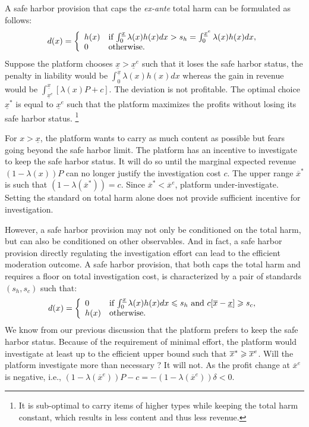 A safe harbor provision that caps the \emph{ex-ante} total harm can be formulated as follows:
\begin{equation}
d(x)=
\left\{\begin{array}{ll}
    h(x) & \mbox{if $\int_0^{\underline{x}}\lambda(x)h(x)dx>s_h=\int_0^{\underline{x}^e}\lambda(x)h(x)dx$}, \\
    0 & \mbox{otherwise}.
\end{array}\right.
\end{equation}
Suppose the platform chooses $\underline{x}>\underline{x}^e$ such that it loses the safe harbor status, the penalty in liability would be $\int_0^{\underline{x}}\lambda(x)h(x)dx$ whereas the gain in revenue would be $\int_{\underline{x}^e}^{\underline{x}}[\lambda(x)P+c]$. The deviation is not profitable.
The optimal choice $\underline{x}^*$ is equal to $\underline{x}^e$ such that the platform maximizes the profits without losing its safe harbor status. 
\footnote{It is sub-optimal to carry items of higher types while keeping the total harm constant, which results in less content and thus less revenue.}

For $x>\underline{x}$, the platform wants to carry as much content as possible but fears going beyond the safe harbor limit. The platform has an incentive to investigate to keep the safe harbor status. It will do so until the marginal expected revenue $(1-\lambda(x))P$ can no longer justify the investigation cost $c$. The upper range $\overline{x}^*$ is such that $(1-\lambda(\overline{x}^*))=c$. 
Since $\overline{x}^*<\overline{x}^e$, platform under-investigate.
Setting the standard on total harm alone does not provide sufficient incentive for investigation.

However, a safe harbor provision may not only be conditioned on the total harm, but can also be conditioned on other observables. And in fact, a safe harbor provision directly regulating the investigation effort can lead to the efficient moderation outcome. A safe harbor provision, that both caps the total harm and requires a floor on total investigation cost, is characterized by a pair of standards $(s_h,s_c)$ such that:
\begin{equation}
d(x)=
\left\{\begin{array}{ll}
    0 & \mbox{if $\int_0^{\underline{x}}\lambda(x)h(x)dx\leqslant s_h$ and $c[\overline{x}-\underline{x}]\geqslant s_c$}, \\
    h(x) & \mbox{otherwise}.
\end{array}\right.
\end{equation}
We know from our previous discussion that the platform prefers to keep the safe harbor status. Because of the requirement of minimal effort, the platform would investigate at least up to the efficient upper bound such that $\overline{x}^*\geqslant\overline{x}^e$. Will the platform investigate more than necessary ? It will not. As the profit change at $\overline{x}^e$ is negative, i.e., $(1-\lambda(\overline{x}^e))P-c=-(1-\lambda(\overline{x}^e))\delta<0$.  

